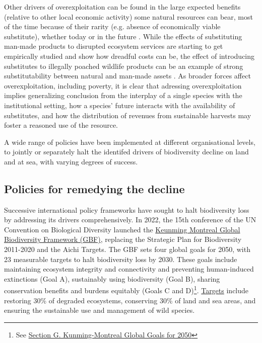 	Other drivers of overexploitation can be found in the large expected benefits (relative to other local economic activity) some natural resources can bear, most of the time because of their rarity (e.g. absence of economically viable substitute), whether today or in the future \citep{Kremer2000}. While the effects of substituting man-made products to disrupted ecosystem services are starting to get empirically studied \citep{frank_economic_2024} and show how dreadful costs can be, the effect of introducing substitutes to illegally poached wildlife products can be an example of strong substitutability between natural and man-made assets \citep{chen_economics_2017}. As broader forces affect overexploitation, including poverty, it is clear that adressing overexploitation implies generalizing conclusion from the interplay of a single species with the institutional setting, how a  species' future interacts with the availability of substitutes, and how the distribution of revenues from sustainable harvests may foster a reasoned use of the resource. 
	
	A wide range of policies have been implemented at different organisational levels, to jointly or separately halt the identifed drivers of biodiversity decline on land and at sea, with varying degrees of success. 
 
\subsection*{Policies for remedying the decline}
\par

Successive international policy frameworks have sought to halt biodiversity loss by addressing its drivers comprehensively. In 2022, the 15th conference of the UN Convention on Biological Diversity launched the \href{https://www.cbd.int/doc/c/e6d3/cd1d/daf663719a03902a9b116c34/cop-15-l-25-en.pdf}{Keunming Montreal Global Biodiversity Framework (GBF)}, replacing the Strategic Plan for Biodiversity 2011-2020 and the Aichi Targets. The GBF sets four global goals for 2050, with 23 measurable targets to halt biodiversity loss by 2030. These goals include maintaining ecosystem integrity and connectivity and preventing human-induced extinctions (Goal A), sustainably using biodiversity (Goal B), sharing conservation benefits and burdens equitably (Goals C and D)\footnote{See \href{https://www.cbd.int/doc/c/e6d3/cd1d/daf663719a03902a9b116c34/cop-15-l-25-en.pdf}{Section G. Kunming-Montreal Global Goals for 2050}}. \href{https://www.cbd.int/gbf/targets/5}{Targets} include restoring 30\% of degraded ecosystems, conserving 30\% of land and sea areas, and ensuring the sustainable use and management of wild species.



